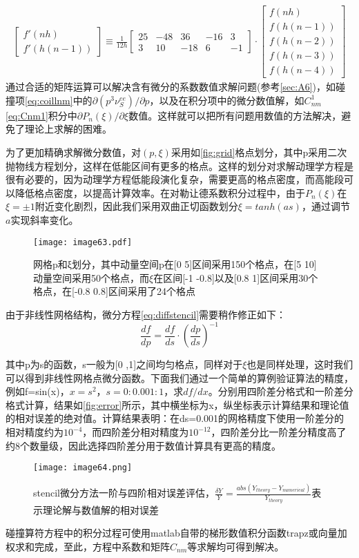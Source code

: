 \begin{align}
\begin{bmatrix}
f'(nh)\\f'(h(n-1))
\end{bmatrix}
\equiv	
\frac{1}{12h}\begin{bmatrix}
  25&  -48&  36&  -16& 3\\
  3&  10&  -18&  6&-1
\end{bmatrix}
\cdot
\begin{bmatrix}
f(nh)\\f(h(n-1))\\f(h(n-2))\\f(h(n-3))\\f(h(n-4))
\end{bmatrix}
\end{align}
通过合适的矩阵运算可以解决含有微分的系数数值求解问题(参考\autoref{sec:A6})，如碰撞项\eqref{eq:coillnm}中的$∂(p^3 ν_S^{ee})/∂p $，以及在积分项中的微分数值解，如$C_{nm}^1$\eqref{eq:Cnm1}积分中$∂P_n (ξ)/∂ξ $数值。这样就可以把所有问题用数值的方法解决，避免了理论上求解的困难。\par
为了更加精确求解微分数值，对$(p,ξ)$采用如\autoref{fig:grid}格点划分，其中p采用二次抛物线方程划分，这样在低能区间有更多的格点。这样的划分对求解动理学方程是很有必要的，因为动理学方程低能段演化复杂，需要更高的格点密度，而高能段可以降低格点密度，以提高计算效率。在对勒让德系数积分过程中，由于$P_n (ξ)$在$ξ=±1$附近变化剧烈，因此我们采用双曲正切函数划分$ξ=tanh⁡(as)$，通过调节$a$实现斜率变化。
\begin{figure}[ht]
\centering
\texttt{[image: image63.pdf]}
\caption{\label{fig:grid}网格p和ξ划分，其中动量空间p在[0 5]区间采用150个格点，在[5 10]动量空间采用50个格点，而$\xi$在区间[-1 -0.8]以及[0.8 1]区间采用30个格点，在[-0.8 0.8]区间采用了24个格点}
\end{figure}
由于非线性网格结构，微分方程\eqref{eq:diffstencil}需要稍作修正如下：
\begin{equation}
\frac{d f}{d p}=\frac{d f}{d s} \cdot\left(\frac{d p}{d s}\right)^{-1}
\end{equation}

\noindent 其中p为s的函数，s一般为[0  ,1]之间均匀格点，同样对于$ξ$也是同样处理，这时我们可以得到非线性网格点微分函数。下面我们通过一个简单的算例验证算法的精度，例如f=sin(x)，$x=s^2$，$s=0:0.001:1$，求$df/dx$。分别用四阶差分格式和一阶差分格式计算，结果如\autoref{fig:error}所示，其中横坐标为x，纵坐标表示计算结果和理论值的相对误差的绝对值。计算结果表明：在ds=0.001的网格精度下使用一阶差分的相对精度约为$10^{-4}$，而四阶差分相对精度为$10^{-12}$，四阶差分比一阶差分精度高了约8个数量级，因此选择四阶差分用于数值计算具有更高的精度。
\begin{figure}[ht]
\centering
\texttt{[image: image64.png]}
\caption{\label{fig:error}stencil微分方法一阶与四阶相对误差评估，$\frac{\delta Y}{Y}=\frac{abs(Y_{theory}-Y_{numerical})}{Y_{theory}}$表示理论解与数值解的相对误差}
\end{figure}\par
碰撞算符方程中的积分过程可使用matlab自带的梯形数值积分函数trapz或向量加权求和完成，至此，方程中系数和矩阵$C_{nm}$等求解均可得到解决。

